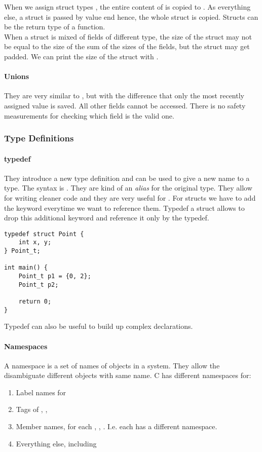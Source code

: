 When we assign struct types , the entire content of  is copied to . As everything else, a struct is passed by value end hence, the whole struct is copied. Structs can be the return type of a function.\\
When a struct is mixed of fields of different type, the size of the struct may not be equal to the size of the sum of the sizes of the fields, but the struct may get padded. We can print the size of the struct with .

\paragraph{Unions}
They are very similar to , but with the difference that only the most recently assigned value is saved. All other fields cannot be accessed. There is no safety measurements for checking which field is the valid one.

\subsubsection{Type Definitions}
\paragraph{typedef}
They introduce a new type definition and can be used to give a new name to a type. The syntax is . They are kind of an \textit{alias} for the original type. They allow for writing cleaner code and they are very useful for . For structs we have to add the  keyword everytime we want to reference them. Typedef a struct allows to drop this additional keyword and reference it only by the typedef.
\begin{lstlisting}
typedef struct Point {
    int x, y;
} Point_t;

int main() {
    Point_t p1 = {0, 2};
    Point_t p2;

    return 0;
}
\end{lstlisting}

Typedef can also be useful to build up complex declarations.

\paragraph{Namespaces}
A namespace is a set of names of objects in a system. They allow the disambiguate different objects with same name. C has different namespaces for:
\begin{enumerate}
    \item Label names for 
    \item Tags of , , 
    \item Member names, for each , , . I.e. each  has a different namespace.
    \item Everything else, including 
\end{enumerate}


